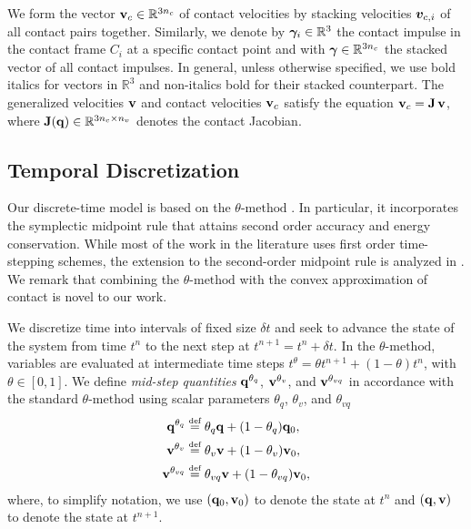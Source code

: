 We form the vector ${\mathbf{v}}_{c}\in\mathbb{R}^{3n_c}$ of contact velocities by
stacking velocities ${\bm{v}}_{c,i}$ of all contact pairs together. Similarly, we
denote by ${\bm\gamma}_i\in\mathbb{R}^3$ the contact impulse in the contact frame
$C_i$ at a specific contact point and with ${\bm\gamma}\in\mathbb{R}^{3n_c}$ the
stacked vector of all contact impulses. In general, unless otherwise specified,
we use bold italics for vectors in $\mathbb{R}^3$ and non-italics bold for their
stacked counterpart. The generalized velocities ${\mathbf{v}}$ and contact velocities
${\mathbf{v}}_c$ satisfy the equation ${\mathbf{v}}_c={\mathbf{J}}\,{\mathbf{v}}$, where
${\mathbf{J}}({\mathbf{q}})\in\mathbb{R}^{3n_c\times n_v}$ denotes the contact Jacobian.

\subsection{Temporal Discretization}
Our discrete-time model is based on the $\theta\text{-method}$ \cite[\S
II.7]{bib:hairer2008solving}. In particular, it incorporates the symplectic
midpoint rule that attains second order accuracy and energy conservation. While
most of the work in the literature uses first order time-stepping schemes, the
extension to the second-order midpoint rule is analyzed in
\cite{bib:potra2006linearly}. We remark that combining the
$\theta\text{-method}$ with the convex approximation of contact is novel to our
work. 

We discretize time into intervals of fixed size $\delta t$ and seek to advance
the state of the system from time $t^n$ to the next step at $t^{n+1} = t^n +
\delta t$. In the $\theta\text{-method}$, variables are evaluated at
intermediate time steps $t^\theta = \theta t^{n+1}+(1-\theta)t^{n}$, with
$\theta \in [0, 1]$. We define \emph{mid-step quantities} ${\mathbf{q}}^{\theta_{q}}$,
${\mathbf{v}}^{\theta_{v}}$, and ${\mathbf{v}}^{\theta_{vq}}$ in accordance with the
standard $\theta\text{-method}$ using scalar parameters $\theta_q$, $\theta_v$,
and $\theta_{vq}$
\begin{align}
	\mf{q}^{\theta_q} &\defeq \theta_q\mf{q} + (1-\theta_{q})\mf{q}_0,\nonumber\\
	\mf{v}^{\theta_v} &\defeq \theta_v\mf{v} + (1-\theta_v)\mf{v}_0,\nonumber\\
	\mf{v}^{\theta_{vq}} &\defeq \theta_{vq}\mf{v} + (1-\theta_{vq})\mf{v}_0,
	\label{eq:theta_method}
\end{align}
where, to simplify notation, we use $({\mathbf{q}}_0, {\mathbf{v}}_0)$ to denote the state
at $t^n$ and $({\mathbf{q}}, {\mathbf{v}})$ to denote the state at $t^{n+1}$.

